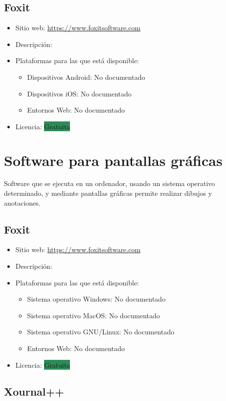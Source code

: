 \documentclass[11pt]{article}
\newcommand{\nodoc}{No documentado}
\newcommand{\gratis}{\colorbox{SeaGreen}{Gratuita}}
\begin{document}
\subsection{Foxit}

\begin{itemize}
\item Sitio web: \url{https://www.foxitsoftware.com}
\item Descripción:
\item Plataformas para las que está disponible:
  \begin{itemize}
  \item Dispositivos Android: \nodoc
  \item Dispositivos iOS: \nodoc
  \item Entornos Web: \nodoc
  \end{itemize}
\item Licencia: \gratis
\end{itemize}

\section{Software para pantallas gráficas}

Software que se ejecuta en un ordenador, usando un sistema operativo
determinado, y mediante pantallas gráficas permite realizar dibujos y
anotaciones.

\subsection{Foxit}

\begin{itemize}
\item Sitio web: \url{https://www.foxitsoftware.com}
\item Descripción:
\item Plataformas para las que está disponible:
  \begin{itemize}
  \item Sistema operativo Windows: \nodoc
  \item Sistema operativo MacOS: \nodoc
  \item Sistema operativo GNU/Linux: \nodoc
  \item Entornos Web: \nodoc
  \end{itemize}
\item Licencia: \gratis
\end{itemize}


\subsection{Xournal++}
\end{document}
